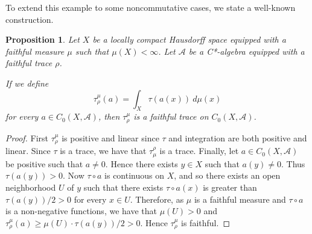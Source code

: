 \documentclass{amsart}
\theoremstyle{plain}
\newtheorem{proposition}[theorem]{Proposition}
\theoremstyle{definition}
\theoremstyle{remark}
\numberwithin{equation}{section}
\newcommand{\A}{{\mathcal{A}}}
\renewcommand{\geq}{\geqslant}
\begin{document}
To extend this example to some noncommutative cases,  we state a well-known construction.

\begin{proposition}\label{p:faithful-extend}
    Let $X$ be a locally compact Hausdorff space equipped with a  faithful measure $\mu$ such that $\mu(X)<\infty$. Let $\A$ be a C*-algebra equipped with a faithful trace $\rho$. 

    If we define
    \[
    \tau_\rho^\mu(a)=\int_X \tau(a(x))\ d\mu(x)
    \]
    for every $a\in C_0(X,\A)$, 
    then $\tau_\rho^\mu$ is a faithful trace on $C_0(X,\A)$.
\end{proposition}
\begin{proof}
    First $\tau^\mu_\rho$ is positive and linear since $\tau$ and integration are both positive and linear. Since $\tau$ is a trace, we have that $\tau^\rho_\mu$ is a trace. Finally, let $a\in C_0(X, \A)$ be positive such that $a\neq 0$. Hence there exists $y\in X$ such that $a(y)\neq 0$. Thus $\tau(a(y))>0$. Now $\tau\circ a$ is continuous on $X$, and so there exists an open neighborhood $U$ of $y$ such that there exists $\tau \circ a(x)$ is greater than $\tau(a(y))/2>0$ for every $x\in U$. Therefore, as $\mu$ is a faithful measure and $\tau\circ a$ is a non-negative functions, we have that $\mu(U)>0 $ and $\tau_\rho^\mu(a)\geq \mu(U) \cdot \tau(a(y))/2>0$. Hence $\tau_\rho^\mu$ is faithful.
\end{proof}
\end{document}

